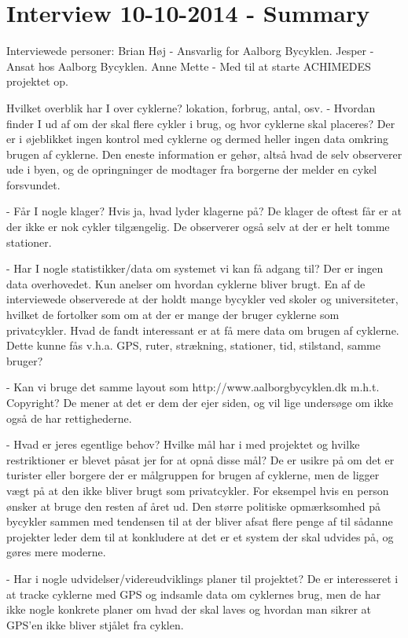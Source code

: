 \chapter{Interview 10-10-2014 - Summary}
\label{interviewReferat}
Interviewede personer:
Brian Høj - Ansvarlig for Aalborg Bycyklen.
Jesper - Ansat hos Aalborg Bycyklen.
Anne Mette - Med til at starte ACHIMEDES projektet op.

Hvilket overblik har I over cyklerne? lokation, forbrug, antal, osv.
- Hvordan finder I ud af om der skal flere cykler i brug, og hvor cyklerne skal placeres?
Der er i øjeblikket ingen kontrol med cyklerne og dermed heller ingen  data omkring brugen
af cyklerne. Den eneste information er gehør, altså hvad de selv observerer ude i byen,
og de opringninger de modtager fra borgerne der melder en cykel forsvundet.

- Får I nogle klager? Hvis ja, hvad lyder klagerne på?
De klager de oftest får er at der ikke er nok cykler tilgængelig. De observerer også selv
at der er helt tomme stationer.

- Har I nogle statistikker/data om systemet vi kan få adgang til?
Der er ingen data overhovedet. Kun anelser om hvordan cyklerne bliver brugt. En af de interviewede
observerede at der holdt mange bycykler ved skoler og universiteter, hvilket de fortolker som om
at der er mange der bruger cyklerne som privatcykler.
Hvad de fandt interessant er at få mere data om brugen af cyklerne. Dette kunne fås v.h.a. GPS, ruter, strækning, stationer, tid, 
stilstand, samme bruger?

- Kan vi bruge det samme layout som http://www.aalborgbycyklen.dk m.h.t. Copyright?
De mener at det er dem der ejer siden, og vil lige undersøge om ikke også de har rettighederne.

- Hvad er jeres egentlige behov? Hvilke mål har i med projektet og hvilke restriktioner er blevet påsat jer for at opnå disse mål?
De er usikre på om det er turister eller borgere der er målgruppen for brugen af cyklerne, men de ligger vægt på at den ikke
bliver brugt som privatcykler. For eksempel hvis en person ønsker at bruge den resten af året ud.
Den større politiske opmærksomhed på bycykler sammen med tendensen til at der bliver afsat flere penge af til sådanne projekter
leder dem til at konkludere at det er et system der skal udvides på, og gøres mere moderne.

- Har i nogle udvidelser/videreudviklings planer til projektet?
De er interesseret i at tracke cyklerne med GPS og indsamle data om cyklernes brug, men de har ikke nogle konkrete planer om hvad
der skal laves og hvordan man sikrer at GPS'en ikke bliver stjålet fra cyklen.

